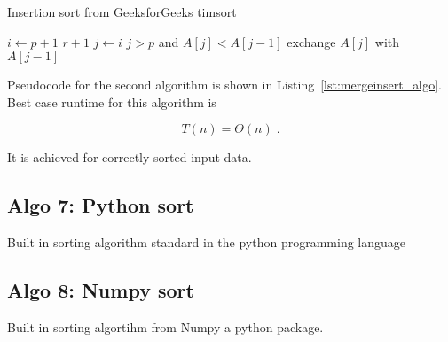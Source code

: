 \documentclass[twocolumn, sigconf, nonacm, natbib, screen, balance=False]{acmart}
\begin{document}
\begin{listing}
  \caption{Insertion sort from GeeksforGeeks timsort}
  \label{lst:insert_algo}
  \begin{codebox}
    \li \For $i \gets p+1$ \To $r+1$
    \li \Do $j \gets i$
    \li 	\While $j>p$ and $A[j]<A[j-1]$
    \li		\Do exchange $A[j]$ with $A[j-1]$
    \End
    \End		
  \end{codebox}
\end{listing}

Pseudocode for the second algorithm is shown in
Listing~\ref{lst:mergeinsert_algo}. Best case runtime for this algorithm
is

\begin{equation}
  T(n) = \Theta(n) \;.  \label{eq:ins_sort_best}
\end{equation}

It is achieved for correctly sorted input data.

\subsection{Algo 7: Python sort}\label{sec:algo8}

Built in sorting algorithm standard in the python programming language

\subsection{Algo 8: Numpy sort}\label{sec:algo9}

Built in sorting algortihm from Numpy a python package.
\end{document}
